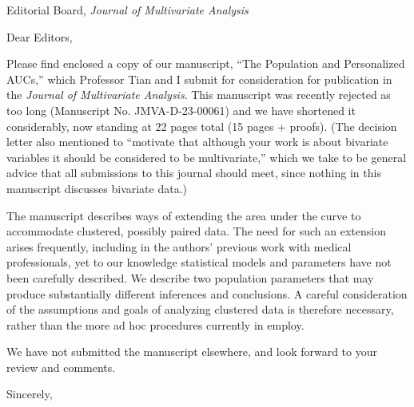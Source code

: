 \documentclass[10pt]{letter}
\begin{document}

\begin{letter}{Editorial Board, \emph{Journal of Multivariate Analysis} } %


\opening{Dear Editors,}

Please find enclosed a copy of our manuscript, ``The Population and
Personalized AUCs,'' which Professor Tian and I submit for
consideration for publication in the \emph{Journal of Multivariate
  Analysis}. This manuscript was recently rejected as too long
(Manuscript No. JMVA-D-23-00061) and we have shortened it
considerably, now standing at 22 pages total (15 pages + proofs). (The decision letter also mentioned to ``motivate that although your work is about bivariate variables it should be considered to be multivariate,'' which we take to be general advice  that all submissions to this journal should meet, since nothing in this manuscript discusses bivariate data.)

The manuscript describes ways of extending the area under the curve to
accommodate clustered, possibly paired data. The need for such an
extension arises frequently, including in the authors' previous work with medical professionals,
yet to our knowledge statistical models and parameters have not been
carefully described. We describe two population parameters that may
produce substantially different inferences and conclusions. A careful
consideration of the assumptions and goals of analyzing clustered data
is therefore necessary, rather than the more ad hoc procedures
currently in employ. %

We have not submitted the manuscript elsewhere, and look forward to your review and
comments.

\vspace{2\parskip} %
\closing{Sincerely,}


\end{letter}
\end{document}
